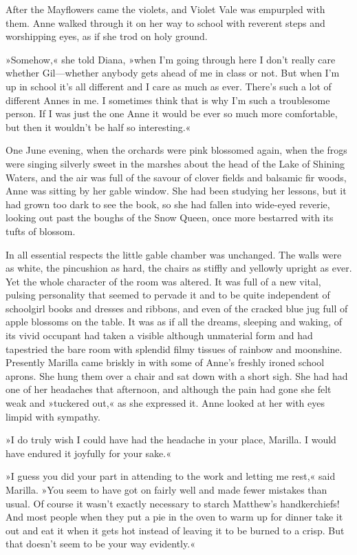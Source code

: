 After the Mayflowers came the violets, and Violet Vale was empurpled with them. Anne walked through it on her way to school with reverent steps and worshipping eyes, as if she trod on holy ground.

»Somehow,« she told Diana, »when I’m going through here I don’t really care whether Gil—whether anybody gets ahead of me in class or not. But when I’m up in school it’s all different and I care as much as ever. There’s such a lot of different Annes in me. I sometimes think that is why I’m such a troublesome person. If I was just the one Anne it would be ever so much more comfortable, but then it wouldn’t be half so interesting.«

One June evening, when the orchards were pink blossomed again, when the frogs were singing silverly sweet in the marshes about the head of the Lake of Shining Waters, and the air was full of the savour of clover fields and balsamic fir woods, Anne was sitting by her gable window. She had been studying her lessons, but it had grown too dark to see the book, so she had fallen into wide-eyed reverie, looking out past the boughs of the Snow Queen, once more bestarred with its tufts of blossom.

In all essential respects the little gable chamber was unchanged. The walls were as white, the pincushion as hard, the chairs as stiffly and yellowly upright as ever. Yet the whole character of the room was altered. It was full of a new vital, pulsing personality that seemed to pervade it and to be quite independent of schoolgirl books and dresses and ribbons, and even of the cracked blue jug full of apple blossoms on the table. It was as if all the dreams, sleeping and waking, of its vivid occupant had taken a visible although unmaterial form and had tapestried the bare room with splendid filmy tissues of rainbow and moonshine. Presently Marilla came briskly in with some of Anne’s freshly ironed school aprons. She hung them over a chair and sat down with a short sigh. She had had one of her headaches that afternoon, and although the pain had gone she felt weak and »tuckered out,« as she expressed it. Anne looked at her with eyes limpid with sympathy.

»I do truly wish I could have had the headache in your place, Marilla. I would have endured it joyfully for your sake.«

»I guess you did your part in attending to the work and letting me rest,« said Marilla. »You seem to have got on fairly well and made fewer mistakes than usual. Of course it wasn’t exactly necessary to starch Matthew’s handkerchiefs! And most people when they put a pie in the oven to warm up for dinner take it out and eat it when it gets hot instead of leaving it to be burned to a crisp. But that doesn’t seem to be your way evidently.«

